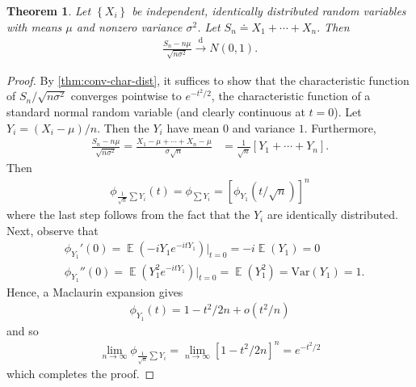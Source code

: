 \documentclass[12pt]{article}
\DeclareMathOperator{\ex}{\mathbb{E}}
\newcommand{\var}{\mathrm{Var}}
\theoremstyle{plain}
\newtheorem{theorem}{Theorem}
\theoremstyle{definition}
\theoremstyle{remark}
\numberwithin{equation}{section}  %
\begin{document}
\begin{theorem}\label{thm:central-limit}
	Let $ \left\{ X_{i} \right\}$ be independent, identically
	distributed random variables with means $\mu$ and nonzero
	variance $\sigma^{2}$. Let $S_{n} \doteq X_{1} + \cdots + X_{n}.$ Then
	\begin{equation*}
		\begin{split}
			\frac{S_{n} - n \mu}{\sqrt{n \sigma^{2}}} \xrightarrow{\text{d}} N(0,1).
		\end{split}
	\end{equation*}
\end{theorem}
\begin{proof}
	By \cref{thm:conv-char-dist}, it suffices to show that
	the characteristic function of $S_{n}/\sqrt{n \sigma^{2}}$ converges
	pointwise to  $e^{-t^{2}/2}$, the characteristic function of 
	a standard normal random variable (and clearly
	continuous at $t=0$). Let
	$Y_{i} = (X_{i} - \mu)/n$. Then the $Y_{i}$ have mean $0$ and
	variance $1$. Furthermore, 
	\begin{equation*}
		\begin{split}
			\frac{S_{n} - n \mu}{\sqrt{n \sigma^{2}}}
			= \frac{X_{1} - \mu+ \cdots + X_{n} - \mu}{\sigma \sqrt{n}}
			& = \frac{1}{\sqrt{n}}\left[ Y_{1} + \cdots + Y_{n} \right].
		\end{split}
	\end{equation*}
	Then
	\begin{equation*}
		\begin{split}
			\phi_{\frac{1}{\sqrt{n}}\sum Y_{i}}(t)
			= \phi_{\sum Y_{i}} = \left[ \phi_{Y_{1}}\left( t/\sqrt{n} \right) \right]^{n}
		\end{split}
	\end{equation*}
	where the last step follows from the fact that the $Y_{i}$ are identically
	distributed. Next, observe that
	\begin{equation*}
		\begin{split}
			& \phi_{Y_{1}}'(0) = \ex (-iY_{1} e^{-itY_{1}}) \vert_{t = 0} = -i
			\ex(Y_{1}) = 0
			\\
			& \phi_{Y_{1}}''(0) = \ex(Y_{1}^{2} e^{-itY_{1}}) \vert_{t = 0} = 
			\ex(Y_{1}^{2}) = \var(Y_{1}) = 1.
		\end{split}
	\end{equation*}
	Hence, a Maclaurin expansion gives
	\begin{equation*}
		\begin{split}
			\phi_{Y_{1}}(t) = 1 - t^{2}/2n + o(t^{2}/n)
		\end{split}
	\end{equation*}
	and so
	\begin{equation*}
		\begin{split}
			\lim_{n \to \infty} \phi_{\frac{1}{\sqrt{n}} \sum Y_{i}}
			= \lim_{n \to \infty} \left[ 1 - t^{2}/2n \right]^{n}
			= e^{-t^{2}/2}
		\end{split}
	\end{equation*}
	which completes the proof.
\end{proof}
\end{document}
